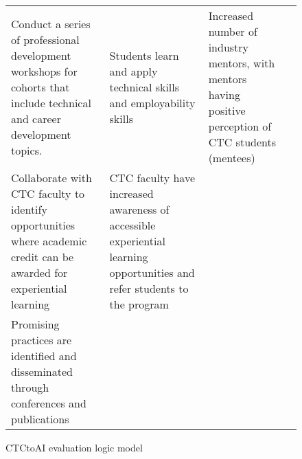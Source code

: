 \begin{figure}
\begin{tabularx}{\linewidth}{L{0.25} L{0.25} L{0.25} L{0.25}}
        Conduct a series of professional development workshops for cohorts that include technical and career development topics. &
        Students learn and apply technical skills and employability skills &
        Increased number of industry mentors, with mentors having positive perception of CTC students (mentees) &
         \\ \addlinespace \hline \addlinespace
         
        Collaborate with CTC faculty to identify opportunities where academic credit can be awarded for experiential learning &
        CTC faculty have increased awareness of accessible experiential learning opportunities and refer students to the program &
        &
         \\ \addlinespace \hline \addlinespace
         
        Promising practices are identified and disseminated through conferences and publications &
        &
        &
        
    \end{tabularx}
    \caption{CTCtoAI evaluation logic model}
    \label{fig:logicModel}
\end{figure}